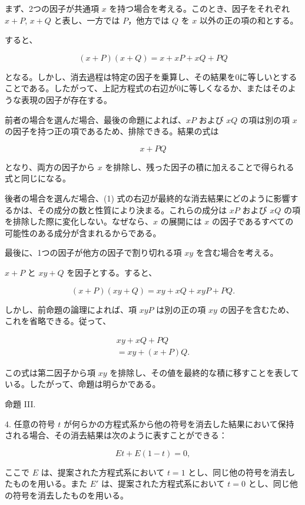\documentclass[a4paper,11pt,openany]{ltjsbook}
\begin{document}
まず、2つの因子が共通項 \( x \) を持つ場合を考える。このとき、因子をそれぞれ \( x + P \), \( x + Q \) と表し、一方では \( P \)，他方では \( Q \) を \( x \) 以外の正の項の和とする。

すると、

\[
(x + P)(x + Q) = x + xP + xQ + PQ
\]

となる。しかし、消去過程は特定の因子を乗算し、その結果を0に等しいとすることである。したがって、上記方程式の右辺が0に等しくなるか、またはそのような表現の因子が存在する。

前者の場合を選んだ場合、最後の命題によれば、\( xP \) および \( xQ \) の項は別の項 \( x \) の因子を持つ正の項であるため、排除できる。結果の式は

\[
x + PQ
\]

となり、両方の因子から \( x \) を排除し、残った因子の積に加えることで得られる式と同じになる。

後者の場合を選んだ場合、(1) 式の右辺が最終的な消去結果にどのように影響するかは、その成分の数と性質により決まる。これらの成分は \( xP \) および \( xQ \) の項を排除した際に変化しない。なぜなら、\( x \) の展開には \( x \) の因子であるすべての可能性のある成分が含まれるからである。

最後に、1つの因子が他方の因子で割り切れる項 \( xy \) を含む場合を考える。

$x + P$ と $xy + Q$ を因子とする。すると、

\[
(x+P)(xy+Q) = xy+xQ+xyP+PQ.
\]

しかし、前命題の論理によれば、項 $xyP$ は別の正の項 $xy$ の因子を含むため、これを省略できる。従って、

\begin{eqnarray*}
xy + xQ + PQ\\
= xy + (x + P) Q.
\end{eqnarray*}

この式は第二因子から項 $xy$ を排除し、その値を最終的な積に移すことを表している。したがって、命題は明らかである。

\begin{center}
\textsc{命題 III.}
\end{center}

4. 任意の符号 $t$ が何らかの方程式系から他の符号を消去した結果において保持される場合、その消去結果は次のように表すことができる：

\[
Et + E(1-t) = 0,
\]

ここで $E$ は、提案された方程式系において $t = 1$ とし、同じ他の符号を消去したものを用いる。また $E'$ は、提案された方程式系において $t = 0$ とし、同じ他の符号を消去したものを用いる。
\end{document}
